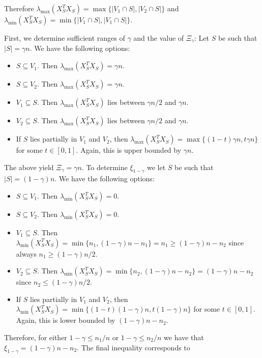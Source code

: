     Therefore $\lambda_{\max} (X_S^TX_S)= \max \{ |V_1 \cap S|, |V_2 \cap S| \}$ and $\lambda_{\min} (X_S^T X_S) = \min \{ |V_1 \cap S|, |V_1 \cap S| \}$.

    First, we determine sufficient ranges of $\gamma$ and the value of $\Xi_\gamma$: Let $S$ be such that $|S| = \gamma n$. We have the following options: 

    \begin{itemize}
        \item $S \subseteq V_1$. Then $\lambda_{\max} (X_S^T X_S) = \gamma n$.
        \item $S \subseteq V_2$. Then $\lambda_{\max} (X_S^T X_S) = \gamma n$.
        \item $V_1 \subseteq S$. Then $\lambda_{\max} (X_S^T X_S)$ lies between $\gamma n /2$ and $\gamma n$. 
        \item $V_2 \subseteq S$. Then $\lambda_{\max} (X_S^T X_S)$ lies between $\gamma n /2$ and $\gamma n$. 
        \item If $S$ lies partially in $V_1$ and $V_2$, then $\lambda_{\max} (X_S^T X_S) = \max \{(1 - t)\gamma n, t \gamma n\}$ for some $t \in [0, 1]$. Again, this is upper bounded by $\gamma n$.   
    \end{itemize}

    The above yield $\Xi_\gamma = \gamma n$. To determine $\xi_{1 - \gamma}$ we let $S$ be such that $|S| = (1 - \gamma) n$. We have the following options: 

    \begin{itemize}
        \item $S \subseteq V_1$. Then $\lambda_{\min} (X_S^T X_S) = 0$. 
        \item $S \subseteq V_2$. Then $\lambda_{\min} (X_S^T X_S) = 0$. 
        \item $V_1 \subseteq S$. Then $\lambda_{\min} (X_S^T X_S) = \min \{ n_1, (1 - \gamma) n - n_1 \} = n_1 \ge (1 - \gamma)n - n_2$ since always $n_1 \ge (1 - \gamma) n/2$. 
        \item $V_2 \subseteq S$. Then $\lambda_{\min} (X_S^T X_S) = \min \{ n_2, (1 - \gamma)n  - n_2 \} = (1 - \gamma)n - n_2$ since $n_2 \le (1 - \gamma)n/2$. 
        \item If $S$ lies partially in $V_1$ and $V_2$, then $\lambda_{\min} (X_S^T X_S) = \min \{(1 - t)(1 - \gamma) n, t (1 - \gamma) n\}$ for some $t \in [0, 1]$. Again, this is lower bounded by $( 1-  \gamma) n - n_2$.
    \end{itemize}

    Therefore, for either $1 - \gamma \le n_1 /n$ or $1 - \gamma \le n_2 / n$ we have that $\xi_{1 - \gamma} = (1 - \gamma) n - n_2$. The final inequality corresponds to 

